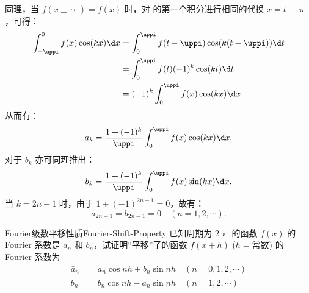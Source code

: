 \begin{myproof}

    同理，当 $f(x \pm \uppi) = f(x)$ 时，对  的第一个积分进行相同的代换 $x = t - \uppi$，可得：
    \begin{equation}
        \begin{aligned}
            \int_{-\uppi}^{0} f(x) \cos(kx) \d x & = \int_{0}^{\uppi} f(t - \uppi) \cos(k(t - \uppi)) \d t \\
                                                 & = \int_{0}^{\uppi} f(t) (-1)^k \cos(kt) \d t            \\
                                                 & = (-1)^k \int_{0}^{\uppi} f(x) \cos(kx) \d x.
        \end{aligned}
    \end{equation}
    从而有：
    \begin{equation}
        a_k = \frac{1 + (-1)^k}{\uppi} \int_{0}^{\uppi} f(x) \cos(kx) \d x.
    \end{equation}
    对于 $b_k$ 亦可同理推出：
    \begin{equation}
        b_k = \frac{1 + (-1)^k}{\uppi} \int_{0}^{\uppi} f(x) \sin(kx) \d x.
    \end{equation}
    当 $k = 2n-1$ 时，由于 $1 + (-1)^{2n-1} = 0$，故有：
    \begin{equation}
        \boxed{a_{2n-1} = b_{2n-1} = 0 \quad (n = 1, 2, \cdots)}.
    \end{equation}
\end{myproof}

\begin{problem}{Fourier级数平移性质}{Fourier-Shift-Property}
    已知周期为 $2\uppi$ 的函数 $f(x)$ 的 Fourier 系数是 $a_n$ 和 $b_n$，试证明“平移”了的函数 $f(x+h)$ ($h = \text{常数}$) 的 Fourier 系数为
    \begin{align*}
        \bar{a}_n & = a_n \cos nh + b_n \sin nh \quad (n = 0, 1, 2, \cdots) \\
        \bar{b}_n & = b_n \cos nh - a_n \sin nh \quad (n = 1, 2, \cdots)
    \end{align*}
\end{problem}

